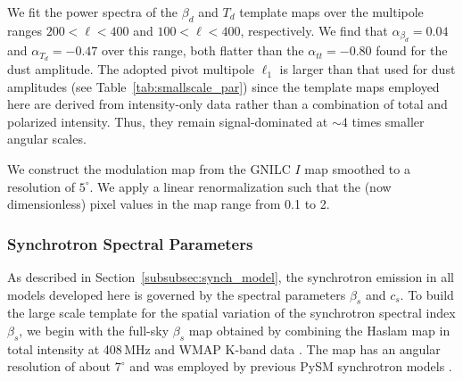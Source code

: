 \documentclass[twocolumn]{aastex631}
\newcommand{\giuse}[1]{\textcolor{orange}{(GP: #1)}}
\begin{document}
We fit the power spectra of the $\beta_d$ and $T_d$ template maps over the multipole ranges $200 < \ell < 400$ and $100 < \ell < 400$, respectively. We find that $\alpha_{\beta_d}= 0.04$ and $\alpha_{T_d} = -0.47$ over this range, both flatter than the $\alpha_{tt} = -0.80$ found for the dust amplitude. The adopted pivot multipole $\ell_1$ is larger than that used for dust amplitudes (see Table~\ref{tab:smallscale_par}) since the template maps employed here are derived from intensity-only data rather than a combination of total and polarized intensity. Thus, they remain signal-dominated at $\sim$4 times smaller angular scales.


We construct the modulation map from the GNILC $I$ map smoothed to a resolution of $5^\circ$. We apply a linear renormalization such that the (now dimensionless) pixel values in the map range from 0.1 to 2. %


 
\subsubsection{Synchrotron Spectral Parameters}\label{sec:beta_s}
As described in Section~\ref{subsubsec:synch_model}, the synchrotron emission in all models developed here is governed by the spectral parameters $\beta_s$ and $c_s$. To build the large scale template for the spatial variation of the synchrotron spectral index $\beta_s$, we begin with the full-sky $\beta_s$ map obtained by combining the Haslam map in total intensity at 408\,MHz \citep{Remazeilles:2015} and WMAP K-band data \citep{Miville-Deschenes:2008}. The map has an angular resolution of about $7^{\circ}$ and was employed by previous PySM synchrotron models \citep{Thorne:2017}.
\end{document}
